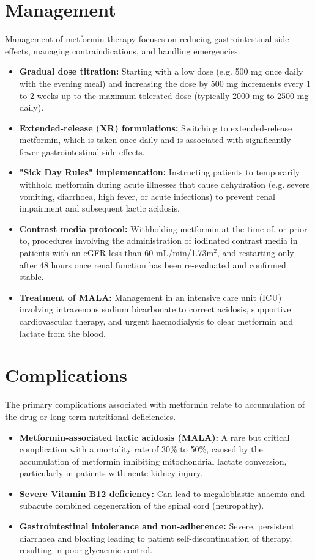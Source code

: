 \section*{Management}
Management of metformin therapy focuses on reducing gastrointestinal side effects, managing contraindications, and handling emergencies.
\begin{itemize}
    \item \textbf{Gradual dose titration:} Starting with a low dose (e.g. 500 mg once daily with the evening meal) and increasing the dose by 500 mg increments every 1 to 2 weeks up to the maximum tolerated dose (typically 2000 mg to 2500 mg daily).
    \item \textbf{Extended-release (XR) formulations:} Switching to extended-release metformin, which is taken once daily and is associated with significantly fewer gastrointestinal side effects.
    \item \textbf{"Sick Day Rules" implementation:} Instructing patients to temporarily withhold metformin during acute illnesses that cause dehydration (e.g. severe vomiting, diarrhoea, high fever, or acute infections) to prevent renal impairment and subsequent lactic acidosis.
    \item \textbf{Contrast media protocol:} Withholding metformin at the time of, or prior to, procedures involving the administration of iodinated contrast media in patients with an eGFR less than 60 mL/min/1.73m$^2$, and restarting only after 48 hours once renal function has been re-evaluated and confirmed stable.
    \item \textbf{Treatment of MALA:} Management in an intensive care unit (ICU) involving intravenous sodium bicarbonate to correct acidosis, supportive cardiovascular therapy, and urgent haemodialysis to clear metformin and lactate from the blood.
\end{itemize}

\section*{Complications}
The primary complications associated with metformin relate to accumulation of the drug or long-term nutritional deficiencies.
\begin{itemize}
    \item \textbf{Metformin-associated lactic acidosis (MALA):} A rare but critical complication with a mortality rate of 30\% to 50\%, caused by the accumulation of metformin inhibiting mitochondrial lactate conversion, particularly in patients with acute kidney injury.
    \item \textbf{Severe Vitamin B12 deficiency:} Can lead to megaloblastic anaemia and subacute combined degeneration of the spinal cord (neuropathy).
    \item \textbf{Gastrointestinal intolerance and non-adherence:} Severe, persistent diarrhoea and bloating leading to patient self-discontinuation of therapy, resulting in poor glycaemic control.
\end{itemize}


